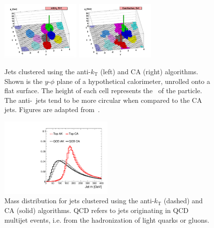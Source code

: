 \begin{figure}[]
    \begin{center}
        \includegraphics[width=0.35\textwidth]{figures/toptagging/gen/ak.png}
        \includegraphics[width=0.35\textwidth]{figures/toptagging/gen/ca.png}
        \caption{Jets clustered using the anti-$k_\mathrm{T}$ (left) and CA (right) algorithms.
                 Shown is the $y$-$\phi$ plane of a hypothetical calorimeter, unrolled onto a flat surface.
                 The height of each cell represents the \pt~of the particle. 
                 The anti-\kt~jets tend to be more circular when compared to the CA jets.
                 Figures are adapted from~\needcite.}
        \label{fig:jets:algos}
    \end{center}
\end{figure}

\begin{figure}[]
    \begin{center}
        \includegraphics[width=0.5\textwidth]{figures/toptagging/gen/clf_M.pdf}
        \caption{Mass distribution for jets clustered using the anti-$k_\mathrm{T}$ (dashed) and CA (solid) algorithms.
                 QCD refers to jets originating in QCD multijet events, i.e. from the hadronization of light quarks or gluons.}
        \label{fig:jets:caak}
    \end{center}
\end{figure}

